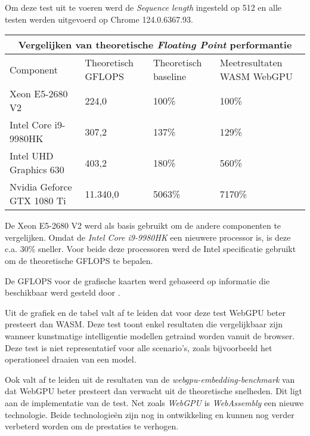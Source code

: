 \bigbreak{}

Om deze test uit te voeren werd de \textit{Sequence length} ingesteld op 512 en alle testen werden uitgevoerd op Chrome 124.0.6367.93.

\break{}

\begin{tabular}{ |p{5cm}|p{3cm}|p{3cm}|p{3cm}|  }
    \hline
    \multicolumn{4}{|c|}{Vergelijken van theoretische \textit{Floating Point} performantie} \\
    \hline
    Component& Theoretisch GFLOPS & Theoretisch baseline & Meetresultaten WASM WebGPU\\
    \hline
        Xeon E5-2680 V2             & 224,0     & 100\%  & 100\%       \\
        Intel Core i9-9980HK        & 307,2     & 137\%  & 129\%    \\
        Intel UHD Graphics 630      & 403,2     & 180\%  & 560\%    \\
        Nvidia Geforce GTX 1080 Ti  & 11.340,0  & 5063\% & 7170\%   \\
    \hline
\end{tabular}

\bigbreak{}

De Xeon E5-2680 V2 werd als basis gebruikt om de andere componenten te vergelijken. Omdat de \textit{Intel Core i9-9980HK} een nieuwere processor is, is deze c.a. 30\% sneller. Voor beide deze processoren werd de Intel specificatie gebruikt om de theoretische GFLOPS te bepalen. \autocite{Intel2024, Intel2024a}

\bigbreak{}

De GFLOPS voor de grafische kaarten werd gebaseerd op informatie die beschikbaar werd gesteld door \textcite{TechPowerUp2017, TechPowerUp2017a}.

\bigbreak{}

Uit de grafiek en de tabel valt af te leiden dat voor deze test WebGPU beter presteert dan WASM. Deze test toont enkel resultaten die vergelijkbaar zijn wanneer kunstmatige intelligentie modellen getraind worden vanuit de browser. Deze test is niet representatief voor alle scenario's, zoals bijvoorbeeld het operationeel draaien van een model.

\bigbreak{}

Ook valt af te leiden uit de resultaten van de \textit{webgpu-embedding-benchmark} van \textcite{Lochner2024} dat WebGPU beter presteert dan verwacht uit de theoretische snelheden. Dit ligt aan de implementatie van de test. Net zoals \textit{WebGPU} is \textit{WebAssembly} een nieuwe technologie. Beide technologieën zijn nog in ontwikkeling en kunnen nog verder verbeterd worden om de prestaties te verhogen.

